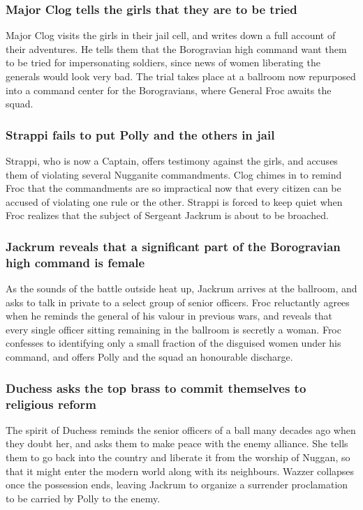 \subsubsection{Major \Gls{Clog} tells the girls that they are to be tried}
Major \Gls{Clog} visits the girls in their jail cell, and writes down a full account of their
adventures. He tells them that the Borogravian high command want them to be tried for impersonating
soldiers, since news of women liberating the generals would look very bad. The trial takes place
at a ballroom now repurposed into a command center for the Borogravians, where General \Gls{Froc}
awaits the squad.

\subsubsection{\Gls{Strappi} fails to put \Gls{Polly} and the others in jail}
\Gls{Strappi}, who is now a Captain, offers testimony against the girls, and accuses them of
violating several Nugganite commandments. \Gls{Clog} chimes in to remind \Gls{Froc} that the
commandments are so impractical now that every citizen can be accused of violating one rule or the
other. \Gls{Strappi} is forced to keep quiet when \Gls{Froc} realizes that the subject of
Sergeant \Gls{Jackrum} is about to be broached.

\subsubsection{\Gls{Jackrum} reveals that a significant part of the Borogravian high command is
    female}
As the sounds of the battle outside heat up, \Gls{Jackrum} arrives at the ballroom, and asks to talk
in private to a select group of senior officers. \Gls{Froc} reluctantly agrees when he reminds the
general of his valour in previous wars, and reveals that every single officer sitting remaining
in the ballroom is secretly a woman. \Gls{Froc} confesses to identifying only a small fraction of
the disguised women under his command, and offers \Gls{Polly} and the squad an honourable discharge.

\subsubsection{\Gls{Duchess} asks the top brass to commit themselves to religious reform}
The spirit of \Gls{Duchess} reminds the senior officers of a ball many decades ago when they doubt
her, and asks them to make peace with the enemy alliance. She tells them to go back into the
country and liberate it from the worship of \Gls{Nuggan}, so that it might enter the modern world
along with its neighbours. \Gls{Wazzer} collapses once the possession ends, leaving \Gls{Jackrum}
to organize a surrender proclamation to be carried by \Gls{Polly} to the enemy.

